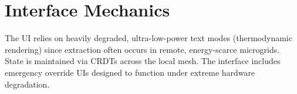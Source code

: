 \section{Interface Mechanics}
The UI relies on heavily degraded, ultra-low-power text modes (thermodynamic rendering) since extraction often occurs in remote, energy-scarce microgrids. State is maintained via CRDTs across the local mesh. The interface includes emergency override UIs designed to function under extreme hardware degradation.
